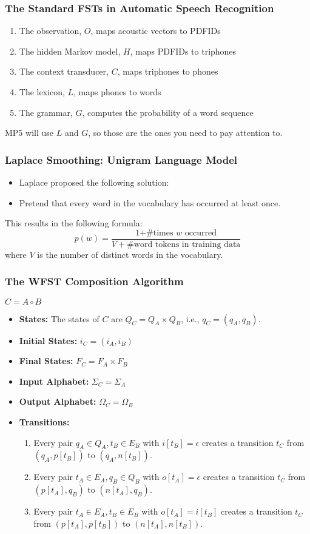 \documentclass{beamer}
\begin{document}
\begin{frame}
  \frametitle{The Standard FSTs in Automatic Speech Recognition}
  \begin{enumerate}
  \item The observation, $O$, maps acoustic vectors to PDFIDs
  \item The hidden Markov model, $H$, maps PDFIDs to triphones
  \item The context transducer, $C$, maps triphones to phones
  \item The lexicon, $L$, maps phones to words
  \item The grammar, $G$, computes the probability of a word sequence
  \end{enumerate}
  MP5 will use $L$ and $G$, so those are the ones you need to pay
  attention to.
\end{frame}


\begin{frame}
  \frametitle{Laplace Smoothing: Unigram Language Model}
  \begin{itemize}
  \item Laplace proposed the following solution:
  \item Pretend that every word in the vocabulary has occurred at least once.
  \end{itemize}
  This results in the following formula:
  \begin{displaymath}
    p(w)=
    \frac{\mbox{1+\# times $w$ occurred}}{V+\mbox{\# word tokens in training data}}
  \end{displaymath}
  where $V$ is the number of distinct words in the vocabulary.
\end{frame}


\begin{frame}
  \frametitle{The WFST Composition Algorithm}
  \centerline{$C = A\circ B$}
  \begin{itemize}
  \item {\bf States:} The states of $C$ are $Q_C=Q_A\times Q_B$,
    i.e., $q_C=(q_A,q_B)$.
  \item {\bf Initial States:} $i_C=(i_A,i_B)$
  \item {\bf Final States:} $F_C=F_A\times F_B$
  \item {\bf Input Alphabet:} $\Sigma_C=\Sigma_A$
  \item {\bf Output Alphabet:} $\Omega_C=\Omega_B$
  \item {\bf Transitions:}
    \begin{enumerate}
    \item Every pair $q_A\in Q_A,t_B\in E_B$ with $i[t_B]=\epsilon$
      creates a transition $t_C$ from $(q_A,p[t_B])$ to
      $(q_A,n[t_B])$.
    \item Every pair $t_A\in E_A,q_B\in Q_B$ with $o[t_A]=\epsilon$
      creates a transition $t_C$ from $(p[t_A],q_B)$ to $(n[t_A],q_B)$.
    \item Every pair $t_A\in E_A,t_B\in E_B$ with $o[t_A]=i[t_B]$ 
      creates a transition $t_C$ from $(p[t_A],p[t_B])$ to
      $(n[t_A],n[t_B])$.
    \end{enumerate}
  \end{itemize}
\end{frame}
\end{document}
